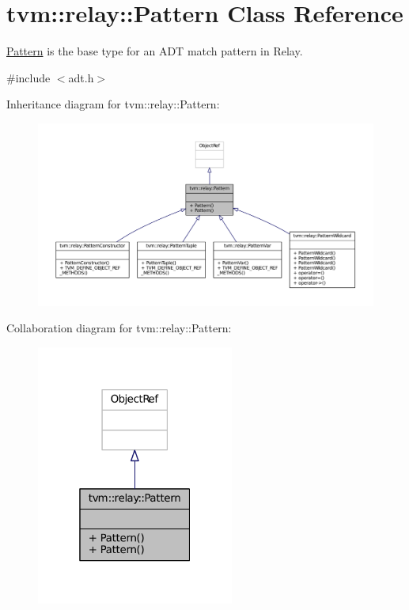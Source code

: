 \hypertarget{classtvm_1_1relay_1_1Pattern}{}\section{tvm\+:\+:relay\+:\+:Pattern Class Reference}
\label{classtvm_1_1relay_1_1Pattern}


\hyperlink{classtvm_1_1relay_1_1Pattern}{Pattern} is the base type for an A\+DT match pattern in Relay.  




{\ttfamily \#include $<$adt.\+h$>$}



Inheritance diagram for tvm\+:\+:relay\+:\+:Pattern\+:
\nopagebreak
\begin{figure}[H]
\begin{center}
\leavevmode
\includegraphics[width=350pt]{classtvm_1_1relay_1_1Pattern__inherit__graph}
\end{center}
\end{figure}


Collaboration diagram for tvm\+:\+:relay\+:\+:Pattern\+:
\nopagebreak
\begin{figure}[H]
\begin{center}
\leavevmode
\includegraphics[width=184pt]{classtvm_1_1relay_1_1Pattern__coll__graph}
\end{center}
\end{figure}
